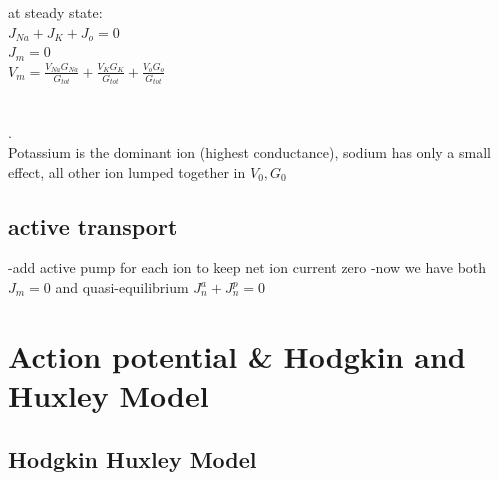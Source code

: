 \documentclass[9pt]{article}
\begin{document}
\begin{multicols}{2}
		at steady state:\\
		$J_{Na}{+}J_K{+}J_o=0$\\
		$J_m=0$\\
		$V_m{=}\frac{V_{Na}G_{Na}}{G_{tot}}{+}\frac{V_KG_K}{G_{tot}}{+}\frac{V_oG_o}{G_{tot}}$\\
		\\\\
		.\\
Potassium is the dominant ion (highest conductance), sodium has only a small effect, all other ion lumped together in $V_0,G_0$\\
		\subsection{active transport}
		-add active pump for each ion to keep net ion current zero
		-now we have both $J_m=0$ and quasi-equilibrium $J_n^a+J_n^p=0$ 
	
		
		\section{Action potential \& Hodgkin and Huxley Model}
		\subsection{Hodgkin Huxley Model}


\end{multicols}
\end{document}

